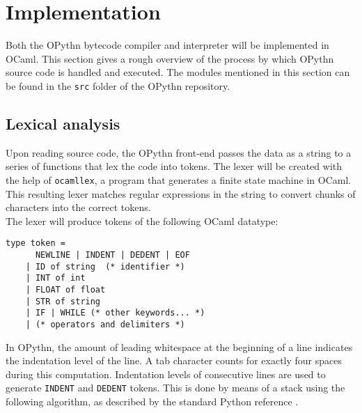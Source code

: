 \documentclass[11pt, twoside]{article}
\newcommand{\ms}{\texttt}
\begin{document}
\section{Implementation}
Both the OPythn bytecode compiler and interpreter will be implemented in OCaml. This section gives a rough overview of the process by which OPythn source code is handled and executed. The modules mentioned in this section can be found in the \ms{src} folder of the OPythn repository.
    \subsection{Lexical analysis}
    Upon reading source code, the OPythn front-end passes the data as a string to a series of functions that lex the code into tokens. The lexer will be created with the help of \texttt{ocamllex}, a program that generates a finite state machine in OCaml. This resulting lexer matches regular expressions in the string to convert chunks of characters into the correct tokens.\\
    \indent The lexer will produce tokens of the following OCaml datatype:
    \begin{lstlisting}[language=caml]
    type token =
      NEWLINE | INDENT | DEDENT | EOF
    | ID of string  (* identifier *)
    | INT of int
    | FLOAT of float
    | STR of string
    | IF | WHILE (* other keywords... *)
    | (* operators and delimiters *)
    \end{lstlisting}
    \indent In OPythn, the amount of leading whitespace at the beginning of a line indicates the indentation level of the line. A tab character counts for exactly four spaces during this computation. Indentation levels of consecutive lines are used to generate \ms{INDENT} and \ms{DEDENT} tokens. This is done by means of a stack using the following algorithm, as described by the standard Python reference \cite{pythonref}.
\end{document}

